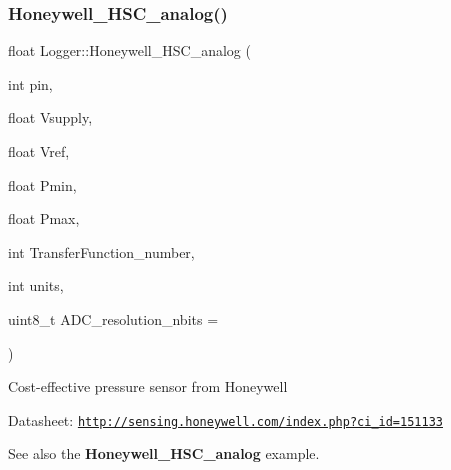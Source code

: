 \subsubsection{\texorpdfstring{Honeywell\+\_\+\+H\+S\+C\+\_\+analog()}{Honeywell\_HSC\_analog()}}
{\footnotesize\ttfamily float Logger\+::\+Honeywell\+\_\+\+H\+S\+C\+\_\+analog (\begin{DoxyParamCaption}\item[{int}]{pin,  }\item[{float}]{Vsupply,  }\item[{float}]{Vref,  }\item[{float}]{Pmin,  }\item[{float}]{Pmax,  }\item[{int}]{Transfer\+Function\+\_\+number,  }\item[{int}]{units,  }\item[{uint8\+\_\+t}]{A\+D\+C\+\_\+resolution\+\_\+nbits = {} }\end{DoxyParamCaption})}

Cost-\/effective pressure sensor from Honeywell

Datasheet\+: \href{http://sensing.honeywell.com/index.php?ci_id=151133}{\tt http\+://sensing.\+honeywell.\+com/index.\+php?ci\+\_\+id=151133}

See also the {\bfseries Honeywell\+\_\+\+H\+S\+C\+\_\+analog} example.



